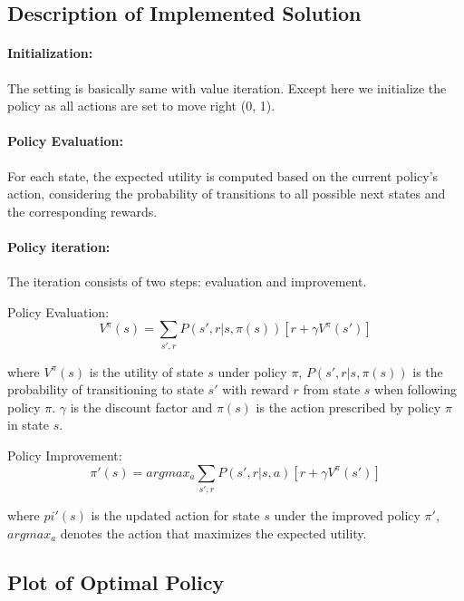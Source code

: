 \documentclass{article}
\begin{document}
\subsection{Description of Implemented Solution}

\paragraph{Initialization:} The setting is basically same with value iteration. Except here we initialize the policy as all actions are set to move right (0, 1).

\paragraph{Policy Evaluation:} For each state, the expected utility is computed based on the current policy's action, considering the probability of transitions to all possible next states and the corresponding rewards.

\paragraph{Policy iteration:} The iteration consists of two steps: evaluation and improvement.

Policy Evaluation: 
\[V^\pi (s) = \sum_{s', r} P(s', r|s, \pi(s))[r + \gamma V^\pi (s')] \]

where $V^\pi(s)$ is the utility of state $s$ under policy $\pi$, $P(s', r | s, \pi(s))$ is the probability of transitioning to state $s'$ with reward $r$ from state $s$ when following policy $\pi$. $\gamma$ is the discount factor and $\pi(s)$ is the action prescribed by policy $\pi$ in state $s$.

Policy Improvement:
\[\pi ' (s) = arg max_a \sum_{s', r} P(s', r|s, a)[r + \gamma V^\pi (s')] \]

where $pi '(s)$ is the updated action for state $s$ under the improved policy $\pi '$, $argmax_a$ denotes the action that maximizes the expected utility.

\subsection{Plot of Optimal Policy}
\end{document}

